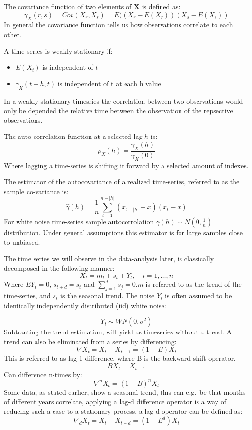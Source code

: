 \documentclass[]{article}
\begin{document}
The covariance function of two elements of \(\mathbf{X}\) is defined as:
\[\gamma_X(r,s)=Cov(X_r, X_s)=E((X_r-E(X_r))(X_s-E(X_s))\] In general
the covariance function tells us how observations correlate to each
other.

A time series is weakly stationary if:

\begin{itemize}
\item
  \(E(X_t)\) is independent of \(t\)
\item
  \(\gamma_X(t+h, t)\) is independent of t at each h value.
\end{itemize}

In a weakly stationary timesries the correlation between two
observations would only be depended the relative time between the
observation of the repsective observations.

The auto correlation function at a selected lag \(h\) is:
\[\rho_X(h)=\dfrac{\gamma_X(h)}{\gamma_X(0)}\] Where lagging a
time-series is shifting it forward by a selected amount of indexes.

The estimator of the autocovariance of a realized time-series, referred
to as the sample co-variance is:
\[\hat{\gamma}(h)=\frac{1}{n}\sum_{t=1}^{n-|h|}(x_{t+|h|}-\bar{x})(x_{t}-\bar{x})\]
For white noise time-series sample autocorrolation
\(\gamma(h)\sim N(0,\frac{1}{n})\) distribution. Under general
assumptions this estimator is for large samples close to unbiased.

The time series we will observe in the data-analysis later, is
classically decomposed in the following manner:
\[X_t = m_t + s_t + Y_t, \quad t=1,\dots,n\] Where \(EY_t = 0\),
\(s_{t+d}=s_t\) and \(\sum_{j=1}^d s_j= 0\).\(m\) is referred to as the
trend of the time-series, and \(s_t\) is the seasonal trend. The noise
\(Y_t\) is often assumed to be identically independently distributed
(iid) white noise:

\[Y_t \sim WN (0,\sigma^2)\] Subtracting the trend estimation, will
yield as timeseries without a trend. A trend can also be eliminated from
a series by differencing: \[\nabla X_t =X_t-X_{t-1}=(1-B)X_t\] This is
referred to as lag-1 difference, where B is the backward shift operator.
\[BX_t = X_{t-1}\] Can difference n-times by:
\[\nabla^n X_t = (1-B)^nX_t\] Some data, as stated earlier, show a
seasonal trend, this can e.g.~be that months of different years
correlate, applying a lag-d difference operator is a way of reducing
such a case to a stationary process, a lag-d operator can be defined as:
\[\nabla_dX_t = X_t-X_{t-d} = (1-B^d)X_t\]
\end{document}
